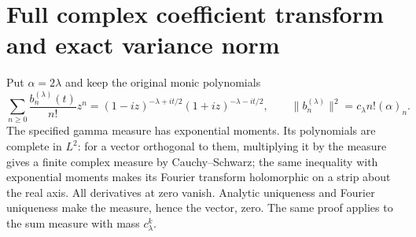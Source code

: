 \documentclass[11pt]{article}
\begin{document}
\section{Full complex coefficient transform and exact variance norm}
Put $\alpha=2\lambda$ and keep the original monic polynomials
\begin{equation}
 \sum_{n\geq0}\frac{b_n^{(\lambda)}(t)}{n!}z^n
 =(1-iz)^{-\lambda+it/2}(1+iz)^{-\lambda-it/2},\qquad
 \|b_n^{(\lambda)}\|^2=c_\lambda n!(\alpha)_n.
 \tag{GP.14}
\end{equation}
The specified gamma measure has exponential moments. Its polynomials
are complete in $L^2$: for a vector orthogonal to them, multiplying
it by the measure gives a finite complex measure by Cauchy--Schwarz;
the same inequality with exponential moments makes its Fourier
transform holomorphic on a strip about the real axis. All derivatives
at zero vanish. Analytic uniqueness and Fourier uniqueness make the
measure, hence the vector, zero. The same proof applies to the sum
measure with mass $c_\lambda^k$.
\end{document}
